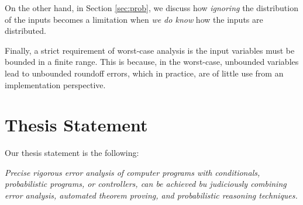 On the other hand, in Section \ref{sec:prob}, we discuss how \emph{ignoring} the distribution of the inputs becomes a limitation when \emph{we do know} how the inputs are distributed.
%

Finally, a strict requirement of worst-case analysis is the input variables must be bounded  in a finite range. This is because, in the worst-case, unbounded variables lead to unbounded roundoff errors, which in practice, are of little use from an implementation perspective.
%
\section{Thesis Statement}
%
Our thesis statement is the following: 

%
\emph{
Precise rigorous error analysis of computer programs with conditionals, probabilistic programs, or controllers, can be achieved bu judiciously combining error analysis, automated theorem proving, and probabilistic reasoning techniques.
%
%	
%
%
%
%
%
}

%
%
%
%
